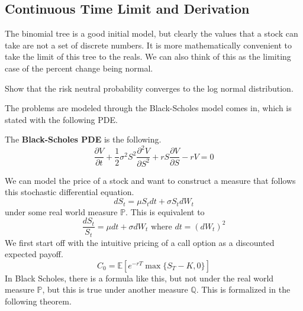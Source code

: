 \documentclass{article}
\begin{document}
  \subsection{Continuous Time Limit and Derivation}

    The binomial tree is a good initial model, but clearly the values that a stock can take are not a set of discrete numbers. It is more mathematically convenient to take the limit of this tree to the reals. We can also think of this as the limiting case of the percent change being normal. 

    \begin{question}[TBD]
      Show that the risk neutral probability converges to the log normal distribution. 
    \end{question}

    The problems are modeled through the Black-Scholes model comes in, which is stated with the following PDE.

    \begin{definition}
      \label{def:black-scholes-pde}
      The \textbf{Black-Scholes PDE} is the following. 
      \begin{equation}
        \frac{\partial V}{\partial t} + \frac{1}{2} \sigma^2 S^2 \frac{\partial^2 V}{\partial S^2} + r S \frac{\partial V}{\partial S} - rV = 0
      \end{equation}
    \end{definition}

    We can model the price of a stock and want to construct a measure that follows this stochastic differential equation. 
    \begin{equation}
      dS_t = \mu S_t dt + \sigma S_t dW_t
    \end{equation}
    under some real world measure $\mathbb{P}$. This is equivalent to 
    \begin{equation}
      \frac{d S_t}{S_t} = \mu dt + \sigma d W_t \text{ where } dt = (dW_t)^2
    \end{equation}
    We first start off with the intuitive pricing of a call option as a discounted expected payoff. 
    \begin{equation}
      C_0 = \mathbb{E} [ e^{-r T} \max\{ S_T - K, 0\}]
    \end{equation}
    In Black Scholes, there is a formula like this, but not under the real world measure $\mathbb{P}$, but this is true under another measure $\mathbb{Q}$.  This is formalized in the following theorem. 
\end{document}
